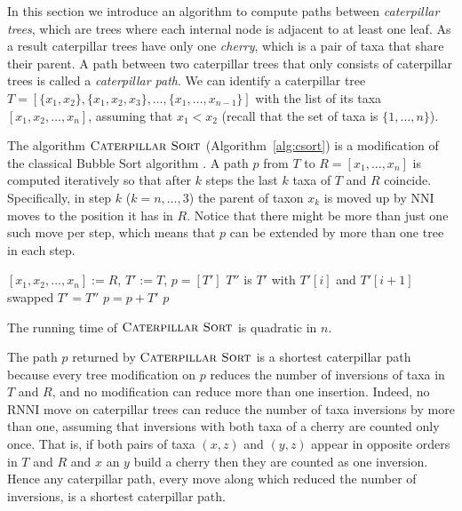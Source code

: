 \documentclass{amsart}
\newcommand{\nni}{\mathrm{NNI}}
\newcommand{\rnni}{\mathrm{RNNI}}
\newcommand{\csort}{\textsc{Caterpillar Sort}}
\begin{document}
In this section we introduce an algorithm to compute paths between \emph{caterpillar trees}, which are trees where each internal node is adjacent to at least one leaf.
As a result caterpillar trees have only one \emph{cherry}, which is a pair of taxa that share their parent.
A path between two caterpillar trees that only consists of caterpillar trees is called a \emph{caterpillar path}.
We can identify a caterpillar tree $T = [\{x_1, x_2\}, \{x_1, x_2, x_3\}, \ldots, \{x_1, \ldots, x_{n-1}\}]$ with the list of its taxa $[x_1, x_2, \ldots, x_n]$, assuming that $x_1 < x_2$ (recall that the set of taxa is $\{1, \ldots, n\}$).

The algorithm $\csort$ (Algorithm~\ref{alg:csort}) is a modification of the classical Bubble Sort algorithm \autocite{Knuth1997-pi}.
A path $p$ from $T$ to $R= [x_1, \ldots, x_n]$ is computed iteratively so that after $k$ steps the last $k$ taxa of $T$ and $R$ coincide.
Specifically, in step $k$ ($k = n, \ldots, 3$) the parent of taxon $x_{k}$ is moved up by $\nni$ moves to the position it has in $R$.
Notice that there might be more than just one such move per step, which means that $p$ can be extended by more than one tree in each step.

\begin{algorithm}[H]
\caption{$\csort$($T,R$)}
\label{alg:csort}
\begin{algorithmic}[1]
\STATE $[x_1, x_2, \ldots, x_n] := R$, $T' := T$, $p = [T']$
            \STATE $T''$ is $T'$ with $T'[i]$ and $T'[i+1]$ swapped
            \STATE $T' = T''$
            \STATE $p = p + T'$
        \ENDIF
    \ENDFOR
\ENDFOR
\RETURN $p$
\end{algorithmic}
\end{algorithm}

The running time of $\csort$ is quadratic in $n$.

The path $p$ returned by $\csort$ is a shortest caterpillar path because every tree modification on $p$ reduces the number of inversions of taxa in $T$ and $R$, and no modification can reduce more than one insertion.
Indeed, no $\rnni$ move on caterpillar trees can reduce the number of taxa inversions by more than one, assuming that inversions with both taxa of a cherry are counted only once.
That is, if both pairs of taxa $(x, z)$ and $(y, z)$ appear in opposite orders in $T$ and $R$ and $x$ an $y$ build a cherry then they are counted as one inversion.
Hence any caterpillar path, every move along which reduced the number of inversions, is a shortest caterpillar path.
\end{document}
